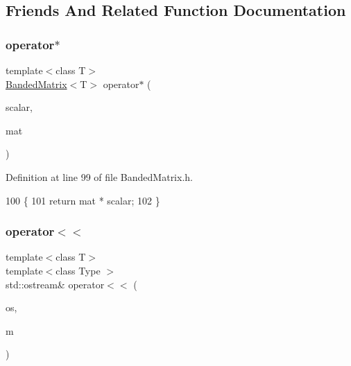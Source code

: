 \subsection{Friends And Related Function Documentation}
\mbox{\label{classLuna_1_1BandedMatrix_a0211cb1d27d84fd2b89c476eefd96b1e}} 
\subsubsection{\texorpdfstring{operator$\ast$}{operator*}}
{\footnotesize\ttfamily template$<$class T$>$ \\
\hyperlink{classLuna_1_1BandedMatrix}{Banded\+Matrix}$<$T$>$ operator$\ast$ (\begin{DoxyParamCaption}\item[{const T \&}]{scalar,  }\item[{\hyperlink{classLuna_1_1BandedMatrix}{Banded\+Matrix}$<$ T $>$ \&}]{mat }\end{DoxyParamCaption})\hspace{0.3cm}{\ttfamily [friend]}}



Definition at line 99 of file Banded\+Matrix.\+h.


\begin{DoxyCode}
100     \{
101       \textcolor{keywordflow}{return} mat * scalar;
102     \}
\end{DoxyCode}
\mbox{\label{classLuna_1_1BandedMatrix_a5f7e5f998704a9afa0d803d600322ee0}} 
\subsubsection{\texorpdfstring{operator$<$$<$}{operator<<}}
{\footnotesize\ttfamily template$<$class T$>$ \\
template$<$class Type $>$ \\
std\+::ostream\& operator$<$$<$ (\begin{DoxyParamCaption}\item[{std\+::ostream \&}]{os,  }\item[{const \hyperlink{classLuna_1_1BandedMatrix}{Banded\+Matrix}$<$ Type $>$ \&}]{m }\end{DoxyParamCaption})\hspace{0.3cm}{\ttfamily [friend]}}



